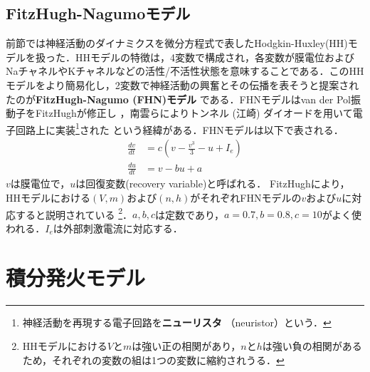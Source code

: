 \subsection{FitzHugh-Nagumoモデル}
前節では神経活動のダイナミクスを微分方程式で表したHodgkin-Huxley(HH)モデルを扱った．HHモデルの特徴は，4変数で構成され，各変数が膜電位およびNaチャネルやKチャネルなどの活性/不活性状態を意味することである．このHHモデルをより簡易化し，2変数で神経活動の興奮とその伝播を表そうと提案されたのが\textbf{FitzHugh-Nagumo (FHN)モデル} である．FHNモデルはvan der Pol振動子をFitzHughが修正し\citep{FitzHugh1955-bx} \citep{Fitzhugh1961-fp}，南雲らによりトンネル (江崎) ダイオードを用いて電子回路上に実装\footnote{神経活動を再現する電子回路を\textbf{ニューリスタ} （neuristor）という．}された \citep{Nagumo1962-ob}という経緯がある．FHNモデルは以下で表される．
\begin{align} 
\frac{dv}{dt} &= c\left(v-\frac{v^3}{3}-u+I_e\right)\\ 
\frac{du}{dt} &= v-bu+a 
\end{align}
$v$は膜電位で，$u$は回復変数(recovery variable)と呼ばれる． FitzHughにより，HHモデルにおける$(V, m)$および$(n, h)$がそれぞれFHNモデルの$v$および$u$に対応すると説明されている \citep{Fitzhugh1961-fp} \footnote{HHモデルにおける$V$と$m$は強い正の相関があり，$n$と$h$は強い負の相関があるため，それぞれの変数の組は1つの変数に縮約されうる．}．$a,b,c$は定数であり，$a=0.7, b=0.8, c=10$がよく使われる．$I_e$は外部刺激電流に対応する．
\section{積分発火モデル}
